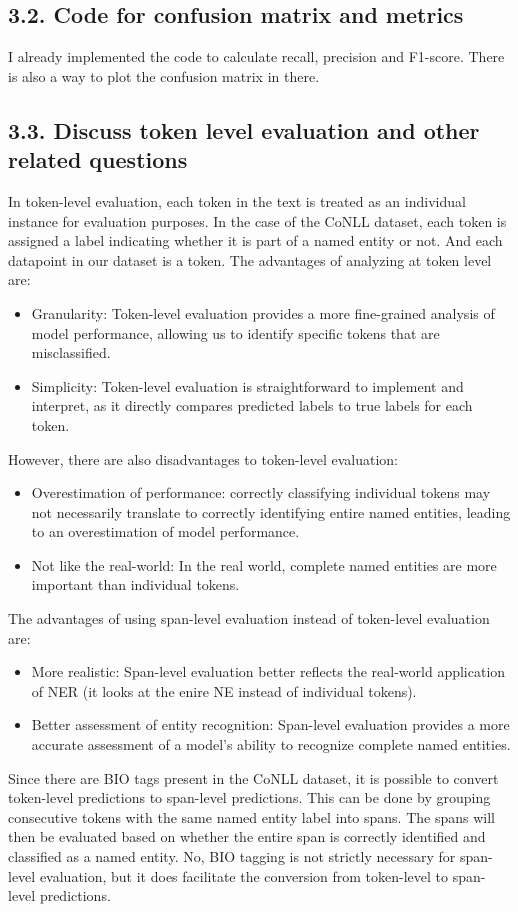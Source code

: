 \documentclass[11pt]{article}
\begin{document}
\subsection*{3.2. Code for confusion matrix and metrics}
I already implemented the code to calculate recall, precision and F1-score.
There is also a way to plot the confusion matrix in there.

\subsection*{3.3. Discuss token level evaluation and other related questions}
In token-level evaluation, each token in the text is treated as an individual instance for evaluation purposes.
In the case of the CoNLL dataset, each token is assigned a label indicating whether it is part of a named entity or not.
And each datapoint in our dataset is a token. The advantages of analyzing at token level are:
\begin{itemize}
    \item Granularity: Token-level evaluation provides a more fine-grained analysis of model performance, allowing us to identify specific tokens that are misclassified.
    \item Simplicity: Token-level evaluation is straightforward to implement and interpret, as it directly compares predicted labels to true labels for each token.
\end{itemize}
However, there are also disadvantages to token-level evaluation:
\begin{itemize}
    \item Overestimation of performance: correctly classifying individual tokens may not necessarily translate to correctly identifying entire named entities, leading to an overestimation of model performance.
    \item Not like the real-world: In the real world, complete named entities are more important than individual tokens.
\end{itemize}
The advantages of using span-level evaluation instead of token-level evaluation are:
\begin{itemize}
    \item More realistic: Span-level evaluation better reflects the real-world application of NER (it looks at the enire NE instead of individual tokens).
    \item Better assessment of entity recognition: Span-level evaluation provides a more accurate assessment of a model's ability to recognize complete named entities.
\end{itemize}
Since there are BIO tags present in the CoNLL dataset, it is possible to convert token-level predictions to span-level predictions.
This can be done by grouping consecutive tokens with the same named entity label into spans.
The spans will then be evaluated based on whether the entire span is correctly identified and classified as a named entity.
No, BIO tagging is not strictly necessary for span-level evaluation, but it does facilitate the conversion from token-level to span-level predictions.
\end{document}
